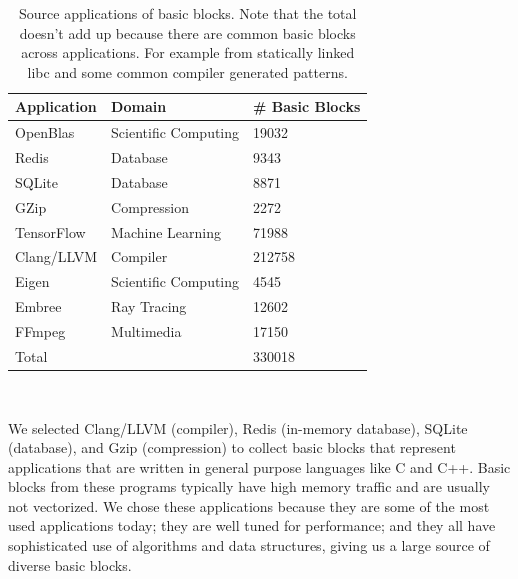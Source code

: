 \begin{table}
\begin{tabular}{|p{}|p{}|p{}|}
\hline
\textbf{Application} & \textbf{Domain} & \textbf{\# Basic Blocks} \\

\hline
OpenBlas & Scientific Computing & 19032 \\

\hline
Redis & Database & 9343  \\

\hline
SQLite & Database & 8871 \\

\hline
GZip & Compression & 2272 \\

\hline
TensorFlow & Machine Learning & 71988 \\

\hline 
Clang/LLVM & Compiler & 212758 \\

\hline
Eigen & Scientific Computing & 4545 \\

\hline
Embree & Ray Tracing & 12602 \\

\hline
FFmpeg & Multimedia & 17150 \\

\hline
\multicolumn{2}{|l|}{Total}  & 330018\\


\hline
\end{tabular}
\\
\caption{Source applications of basic blocks. Note that the total doesn't add up because there are common basic blocks across applications. For example from statically linked libc and some common compiler generated patterns.}
\label{tab:apps}
\end{table}

We selected Clang/LLVM\cite{llvm} (compiler),
Redis (in-memory database), SQLite (database), and Gzip (compression)
to collect basic blocks that represent
applications that are written in general purpose languages
like C and C++.
Basic blocks from these programs
typically have high memory traffic and are usually not vectorized.
We chose these applications because they are some of the most used
applications today; they are well tuned for performance;
and they all have sophisticated use of algorithms and data structures,
giving us a large source of diverse basic blocks.

